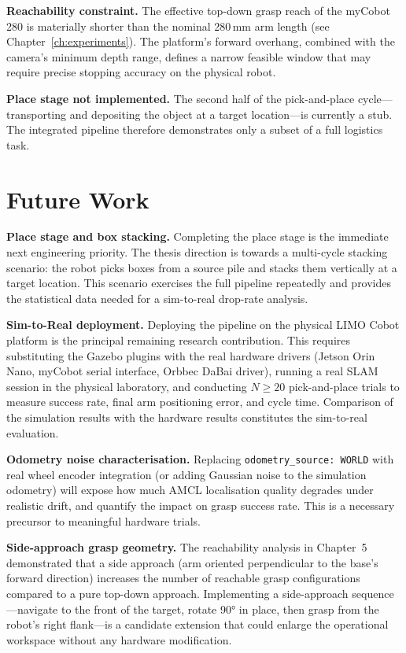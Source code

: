 \textbf{Reachability constraint.} The effective top-down grasp reach of the myCobot
280 is materially shorter than the nominal 280\,mm arm length (see
Chapter~\ref{ch:experiments}). The platform's forward overhang, combined with the
camera's minimum depth range, defines a narrow feasible window that may require precise
stopping accuracy on the physical robot.

\textbf{Place stage not implemented.} The second half of the pick-and-place cycle---
transporting and depositing the object at a target location---is currently a stub.
The integrated pipeline therefore demonstrates only a subset of a full logistics task.

\section{Future Work}

\textbf{Place stage and box stacking.} Completing the place stage is the immediate
next engineering priority. The thesis direction is towards a multi-cycle stacking
scenario: the robot picks boxes from a source pile and stacks them vertically at a
target location. This scenario exercises the full pipeline repeatedly and provides
the statistical data needed for a sim-to-real drop-rate analysis.

\textbf{Sim-to-Real deployment.} Deploying the pipeline on the physical LIMO Cobot
platform is the principal remaining research contribution. This requires substituting
the Gazebo plugins with the real hardware drivers (Jetson Orin Nano, myCobot serial
interface, Orbbec DaBai driver), running a real SLAM session in the physical
laboratory, and conducting $N \ge 20$ pick-and-place trials to measure success rate,
final arm positioning error, and cycle time. Comparison of the simulation results
with the hardware results constitutes the sim-to-real evaluation.

\textbf{Odometry noise characterisation.} Replacing \texttt{odometry\_source: WORLD}
with real wheel encoder integration (or adding Gaussian noise to the simulation
odometry) will expose how much AMCL localisation quality degrades under realistic
drift, and quantify the impact on grasp success rate. This is a necessary precursor to
meaningful hardware trials.

\textbf{Side-approach grasp geometry.} The reachability analysis in Chapter~5
demonstrated that a side approach (arm oriented perpendicular to the base's forward
direction) increases the number of reachable grasp configurations compared to a pure
top-down approach. Implementing a side-approach sequence---navigate to the front of the
target, rotate 90° in place, then grasp from the robot's right flank---is a candidate
extension that could enlarge the operational workspace without any hardware modification.

